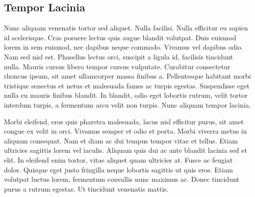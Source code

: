     \subsection{Tempor Lacinia}
        Nunc aliquam venenatis tortor sed aliquet. Nulla facilisi. Nulla efficitur eu sapien id scelerisque. Cras posuere lectus quis augue blandit volutpat. Duis euismod lorem in sem euismod, nec dapibus neque commodo. Vivamus vel dapibus odio. Nam sed nisl est. Phasellus lectus orci, suscipit a ligula id, facilisis tincidunt nulla. Mauris cursus libero tempor cursus vulputate. Curabitur consectetur rhoncus ipsum, sit amet ullamcorper massa finibus a. Pellentesque habitant morbi tristique senectus et netus et malesuada fames ac turpis egestas. Suspendisse eget nulla eu mauris finibus blandit. In blandit, odio eget lobortis rutrum, velit tortor interdum turpis, a fermentum arcu velit non turpis. Nunc aliquam tempor lacinia.

        Morbi eleifend, eros quis pharetra malesuada, lacus nisl efficitur purus, sit amet congue ex velit in orci. Vivamus semper et odio et porta. Morbi viverra metus in aliquam consequat. Nam et diam ac dui tempus tempor vitae et tellus. Etiam ultricies sagittis lorem vel iaculis. Aliquam quis dui ac ante blandit lacinia sed et elit. In eleifend enim tortor, vitae aliquet quam ultricies at. Fusce ac feugiat dolor. Quisque eget justo fringilla neque lobortis sagittis ut quis eros. Etiam volutpat luctus lorem, fermentum convallis nunc maximus ac. Donec tincidunt purus a rutrum egestas. Ut tincidunt venenatis mattis.
